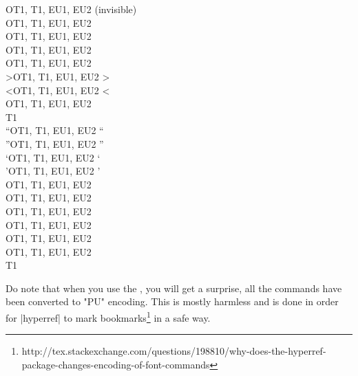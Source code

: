\begin{tabbing}
\ttverb\textcompwordmark  \>OT1, T1, EU1, EU2\>   \textcompwordmark\> (invisible) \\
\ttverb\textdollar        \>OT1, T1, EU1, EU2\>   \textdollar      \>  \\
\ttverb\textemdash        \>OT1, T1, EU1, EU2\>   \textemdash      \>  \\
\ttverb\textendash        \>OT1, T1, EU1, EU2\>   \textendash      \>  \\
\ttverb\textexclamdown    \>OT1, T1, EU1, EU2\>   \textexclamdown  \>  \\
\ttverb\textgreater       \>OT1, T1, EU1, EU2\>   \textgreater     \>  \\
\ttverb\textless          \>OT1, T1, EU1, EU2\>   \textless        \>  \\
\ttverb\textquestiondown  \>OT1, T1, EU1, EU2\>   \textquestiondown\>  \\
\ttverb\textquotedbl      \>T1    \>   \textquotedbl    \>  \\
\ttverb\textquotedblleft  \>OT1, T1, EU1, EU2\>   \textquotedblleft\>  \\
\ttverb\textquotedblright \>OT1, T1, EU1, EU2\>   \textquotedblright\> \\
\ttverb\textquoteleft     \>OT1, T1, EU1, EU2\>   \textquoteleft   \>  \\
\ttverb\textquoteright    \>OT1, T1, EU1, EU2\>   \textquoteright  \>  \\
\ttverb\textregistered    \>OT1, T1, EU1, EU2\>   \textregistered  \>  \\
\ttverb\textsection       \>OT1, T1, EU1, EU2\>   \textsection     \>  \\
\ttverb\textsterling      \>OT1, T1, EU1, EU2\>   \textsterling    \>  \\
\ttverb\texttrademark     \>OT1, T1, EU1, EU2\>   \texttrademark   \>  \\
\ttverb\textunderscore    \>OT1, T1, EU1, EU2\>   \textunderscore  \>  \\
\ttverb\textvisiblespace  \>OT1, T1, EU1, EU2\>   \textvisiblespace\>  \\
\ttverb\th                \>T1    \>   \th              \>
\end{tabbing}                        

Do note that when you use the , you will get a surprise, all the commands have been converted to "PU" encoding. This is mostly harmless and is  done in order for |hyperref| to mark bookmarks\footnote{http://tex.stackexchange.com/questions/198810/why-does-the-hyperref-package-changes-encoding-of-font-commands} in a safe way.

